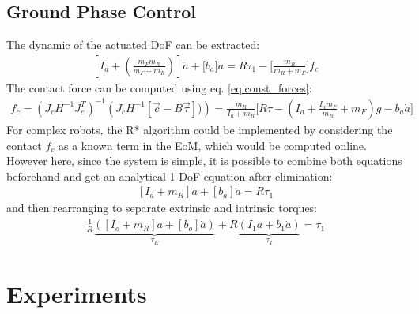 \subsection{Ground Phase Control}

The dynamic of the actuated DoF can be extracted:
%
\begin{align}
\left[ I_a + \left( \frac{m_F m_R}{m_F + m_R} \right) \right] \ddot{a} + \Bigg[ b_a \Bigg] \dot{a} = R \tau_1 - \Bigg[ \frac{m_R}{m_R+m_F} \Bigg] f_c
\end{align}
%
The contact force can be computed using eq. \eqref{eq:const_forces}:
%
\begin{align}
f_c = \left( J_c H^{-1} J_c^T \right)^{-1} \left(  J_c H^{-1} [\vec{c} - B \vec{\tau} ] ) \right)
= \frac{m_R}{I_a+m_R} \Bigg[ R \tau - \left(I_a + \frac{I_a m_F}{m_R} + m_F \right) g - b_a \dot{a} \Bigg]
\end{align}
%
For complex robots, the R* algorithm could be implemented by considering the contact $f_c$ as a known term in the EoM, which would be computed online. However here, since the system is simple, it is possible to combine both equations beforehand and get an analytical 1-DoF equation after elimination:
%
\begin{align}
\left[ I_a + m_R \right] \ddot{a} + \left[ b_a \right] \dot{a} = R \tau_1 
\end{align}
%
and then rearranging to separate extrinsic and intrinsic torques:
%
\begin{align} 
\frac{1}{R}
\underbrace{\left(
\left[ I_o + m_R \right] \ddot{a} + \left[ b_o \right] \dot{a}
\right)}_{\tau_E}
+ R
\underbrace{\left(
 I_1 \ddot{a} + b_1 \dot{a}
\right)}_{\tau_I}
= \tau_1
\end{align}
%



\section{Experiments}
\label{sec:case_exp}



